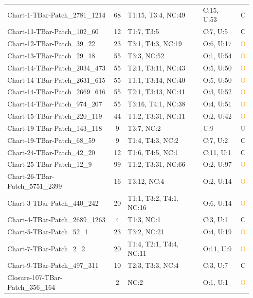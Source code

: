 \begin{longtable}{l|c|l|l|c}
Chart-1-TBar-Patch\_2781\_1214 & 68 & T1:15, T3:4, NC:49 & C:15, U:53 & \textcolor{green!60!black}{C} \\
Chart-11-TBar-Patch\_102\_60 & 12 & T1:7, T3:5 & C:7, U:5 & \textcolor{green!60!black}{C} \\
Chart-12-TBar-Patch\_39\_22 & 23 & T3:1, T4:3, NC:19 & O:6, U:17 & \textcolor{orange}{O} \\
Chart-13-TBar-Patch\_29\_18 & 55 & T3:3, NC:52 & O:1, U:54 & \textcolor{orange}{O} \\
Chart-14-TBar-Patch\_2034\_473 & 55 & T2:1, T3:11, NC:43 & O:5, U:50 & \textcolor{orange}{O} \\
Chart-14-TBar-Patch\_2631\_615 & 55 & T1:1, T3:14, NC:40 & O:5, U:50 & \textcolor{orange}{O} \\
Chart-14-TBar-Patch\_2669\_616 & 55 & T2:1, T3:13, NC:41 & O:3, U:52 & \textcolor{orange}{O} \\
Chart-14-TBar-Patch\_974\_207 & 55 & T3:16, T4:1, NC:38 & O:4, U:51 & \textcolor{orange}{O} \\
Chart-15-TBar-Patch\_220\_119 & 44 & T1:2, T3:31, NC:11 & O:2, U:42 & \textcolor{orange}{O} \\
Chart-19-TBar-Patch\_143\_118 & 9 & T3:7, NC:2 & U:9 & \textcolor{gray}{U} \\
Chart-19-TBar-Patch\_68\_59 & 9 & T1:4, T4:3, NC:2 & C:7, U:2 & \textcolor{green!60!black}{C} \\
Chart-24-TBar-Patch\_42\_20 & 12 & T1:6, T4:5, NC:1 & C:11, U:1 & \textcolor{green!60!black}{C} \\
Chart-25-TBar-Patch\_12\_9 & 99 & T1:2, T3:31, NC:66 & O:2, U:97 & \textcolor{orange}{O} \\
Chart-26-TBar-Patch\_5751\_2399 & 16 & T3:12, NC:4 & O:2, U:14 & \textcolor{orange}{O} \\
Chart-3-TBar-Patch\_440\_242 & 20 & T1:1, T3:2, T4:1, NC:16 & O:6, U:14 & \textcolor{orange}{O} \\
Chart-4-TBar-Patch\_2689\_1263 & 4 & T1:3, NC:1 & C:3, U:1 & \textcolor{green!60!black}{C} \\
Chart-5-TBar-Patch\_52\_1 & 23 & T3:2, NC:21 & O:4, U:19 & \textcolor{orange}{O} \\
Chart-7-TBar-Patch\_2\_2 & 20 & T1:4, T2:1, T4:4, NC:11 & O:11, U:9 & \textcolor{orange}{O} \\
Chart-9-TBar-Patch\_497\_311 & 10 & T2:3, T3:3, NC:4 & C:3, U:7 & \textcolor{green!60!black}{C} \\
Closure-107-TBar-Patch\_356\_164 & 2 & NC:2 & O:1, U:1 & \textcolor{orange}{O} \\

\end{longtable}
